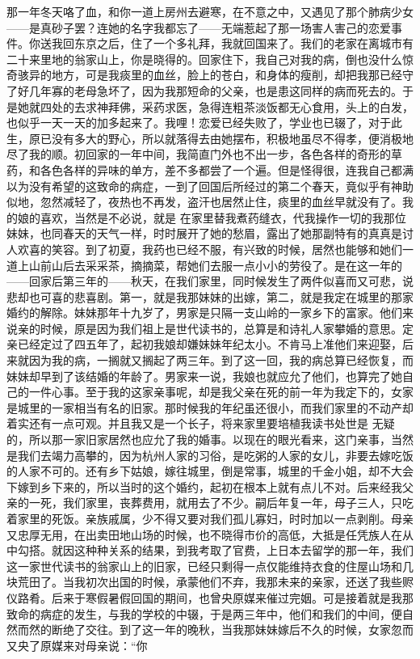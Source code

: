 \documentclass{article}
\begin{document}
\newpage

那一年冬天咯了血，和你一道上房州去避寒，在不意之中，又遇见了那个肺病少女——是真砂子罢？连她的名字我都忘了——无端惹起了那一场害人害己的恋爱事件。你送我回东京之后，住了一个多礼拜，我就回国来了。我们的老家在离城市有二十来里地的翁家山上，你是晓得的。回家住下，我自己对我的病，倒也没什么惊奇骇异的地方，可是我痰里的血丝，脸上的苍白，和身体的瘦削，却把我那已经守了好几年寡的老母急坏了，因为我那短命的父亲，也是患这同样的病而死去的。于是她就四处的去求神拜佛，采药求医，急得连粗茶淡饭都无心食用，头上的白发，也似乎一天一天的加多起来了。我哩！恋爱已经失败了，学业也已辍了，对于此生，原已没有多大的野心，所以就落得去由她摆布，积极地虽尽不得孝，便消极地尽了我的顺。初回家的一年中间，我简直门外也不出一步，各色各样的奇形的草药，和各色各样的异味的单方，差不多都尝了一个遍。但是怪得很，连我自己都满以为没有希望的这致命的病症，一到了回国后所经过的第二个春天，竟似乎有神助似地，忽然减轻了，夜热也不再发，盗汗也居然止住，痰里的血丝早就没有了。我的娘的喜欢，当然是不必说，就是
\newpage
在家里替我煮药缝衣，代我操作一切的我那位妹妹，也同春天的天气一样，时时展开了她的愁眉，露出了她那副特有的真真是讨人欢喜的笑容。到了初夏，我药也已经不服，有兴致的时候，居然也能够和她们一道上山前山后去采采茶，摘摘菜，帮她们去服一点小小的劳役了。是在这一年的——回家后第三年的——秋天，在我们家里，同时候发生了两件似喜而又可悲，说悲却也可喜的悲喜剧。第一，就是我那妹妹的出嫁，第二，就是我定在城里的那家婚约的解除。妹妹那年十九岁了，男家是只隔一支山岭的一家乡下的富家。他们来说亲的时候，原是因为我们祖上是世代读书的，总算是和诗礼人家攀婚的意思。定亲已经定过了四五年了，起初我娘却嫌妹妹年纪太小。不肯马上准他们来迎娶，后来就因为我的病，一搁就又搁起了两三年。到了这一回，我的病总算已经恢复，而妹妹却早到了该结婚的年龄了。男家来一说，我娘也就应允了他们，也算完了她自己的一件心事。至于我的这家亲事呢，却是我父亲在死的前一年为我定下的，女家是城里的一家相当有名的旧家。那时候我的年纪虽还很小，而我们家里的不动产却着实还有一点可观。并且我又是一个长子，将来家里要培植我读书处世是
\newpage
无疑的，所以那一家旧家居然也应允了我的婚事。以现在的眼光看来，这门亲事，当然是我们去竭力高攀的，因为杭州人家的习俗，是吃粥的人家的女儿，非要去嫁吃饭的人家不可的。还有乡下姑娘，嫁往城里，倒是常事，城里的千金小姐，却不大会下嫁到乡下来的，所以当时的这个婚约，起初在根本上就有点儿不对。后来经我父亲的一死，我们家里，丧葬费用，就用去了不少。嗣后年复一年，母子三人，只吃着家里的死饭。亲族戚属，少不得又要对我们孤儿寡妇，时时加以一点剥削。母亲又忠厚无用，在出卖田地山场的时候，也不晓得市价的高低，大抵是任凭族人在从中勾搭。就因这种种关系的结果，到我考取了官费，上日本去留学的那一年，我们这一家世代读书的翁家山上的旧家，已经只剩得一点仅能维持衣食的住屋山场和几块荒田了。当我初次出国的时候，承蒙他们不弃，我那未来的亲家，还送了我些赆仪路肴。后来于寒假暑假回国的期间，也曾央原媒来催过完姻。可是接着就是我那致命的病症的发生，与我的学校的中辍，于是两三年中，他们和我们的中间，便自然而然的断绝了交往。到了这一年的晚秋，当我那妹妹嫁后不久的时候，女家忽而又央了原媒来对母亲说：“你
\end{document}
